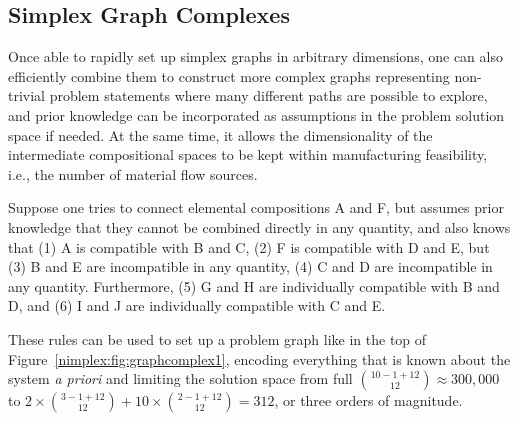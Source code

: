 \subsection{Simplex Graph Complexes} \label{nimplex:ssec:complexes}

Once able to rapidly set up simplex graphs in arbitrary dimensions, one can also efficiently combine them to construct more complex graphs representing non-trivial problem statements where many different paths are possible to explore, and prior knowledge can be incorporated as assumptions in the problem solution space if needed. At the same time, it allows the dimensionality of the intermediate compositional spaces to be kept within manufacturing feasibility, i.e., the number of material flow sources.

Suppose one tries to connect elemental compositions A and F, but assumes prior knowledge that they cannot be combined directly in any quantity, and also knows that (1) A is compatible with B and C, (2) F is compatible with D and E, but (3) B and E are incompatible in any quantity, (4) C and D are incompatible in any quantity. Furthermore, (5) G and H are individually compatible with B and D, and (6) I and J are individually compatible with C and E. 

These rules can be used to set up a problem graph like in the top of Figure~\ref{nimplex:fig:graphcomplex1}, encoding everything that is known about the system \textit{a priori} and limiting the solution space from full $\binom{10-1+12}{12} \approx 300,000$ to $2\times\binom{3-1+12}{12} + 10\times\binom{2-1+12}{12} = 312$, or three orders of magnitude.

